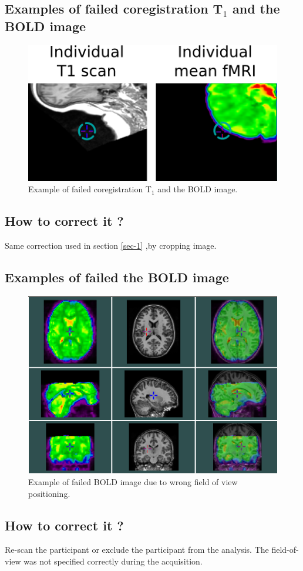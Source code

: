 \documentclass[12pt]{paper}%
\begin{document}
\subsection{Examples of failed coregistration T$_1$ and the BOLD image}
\begin{figure}[htbp]
\begin{center}
\includegraphics[width=0.4\linewidth]{fig_qc_fail_func}
\end{center}
\caption{
{ Example of failed coregistration T$_1$ and the BOLD image.}
}
\label{fig_qc_fail_func}
\end{figure}
\subsection*{How to correct it ?}
Same correction used in section \ref{sec-1} ,by cropping image.


\subsection{Examples of failed the BOLD image}
\begin{figure}[htbp]
\begin{center}
\includegraphics[width=0.8\linewidth]{fig_qc_fail_func2}
\end{center}
\caption{
{ Example of failed BOLD image due to wrong field of view positioning.}
}
\label{fig_qc_fail_func2}
\end{figure}
\subsection*{How to correct it ?}
Re-scan the participant or exclude the participant from the analysis. The field-of-view was not specified correctly during the acquisition.
\end{document}
